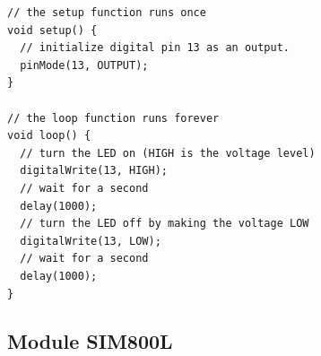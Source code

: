 	\begin{lstlisting}[caption=Đoạn code nháy đèn căn bản]
// the setup function runs once
void setup() {
  // initialize digital pin 13 as an output.
  pinMode(13, OUTPUT);
}

// the loop function runs forever
void loop() {
  // turn the LED on (HIGH is the voltage level)
  digitalWrite(13, HIGH);   
  // wait for a second
  delay(1000);    
  // turn the LED off by making the voltage LOW          
  digitalWrite(13, LOW);    
  // wait for a second
  delay(1000);              
}

	\end{lstlisting}







\subsection{Module SIM800L}\label{sec:sim800l}
